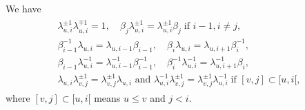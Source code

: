 \documentclass[a4paper,11pt]{amsart}
\numberwithin{equation}{section}
\begin{document}
\begin{lemma}\label{lemma:jm-elements}
We have
\begin{gather}\label{eq:jm-relations}
\begin{gathered}
\lambda_{u,i}^{\pm 1}\lambda_{u,i}^{\mp 1}=1
,\quad
\beta_{j}\lambda_{u,i}^{\pm 1}
=
\lambda_{u,i}^{\pm 1}\beta_{j}
\;\text{if }i-1,i\neq j,
\\
\beta_{i-1}^{-1}\lambda_{u,i}
=
\lambda_{u,i-1}\beta_{i-1}
,\quad
\beta_{i}\lambda_{u,i}
=
\lambda_{u,i+1}\beta_{i}^{-1}
,\\
\beta_{i-1}\lambda_{u,i}^{-1}
=
\lambda_{u,i-1}^{-1}\beta_{i-1}^{-1}
,\quad
\beta_{i}^{-1}\lambda_{u,i}^{-1}
=
\lambda_{u,i+1}^{-1}\beta_{i}
,
\\
\lambda_{u,i}\lambda_{v,j}^{\pm 1}
=\lambda_{v,j}^{\pm 1}\lambda_{u,i}
\text{ and }
\lambda_{u,i}^{-1}\lambda_{v,j}^{\pm 1}
=\lambda_{v,j}^{\pm 1}\lambda_{u,i}^{-1}
\;\text{if }[v,j]\subset[u,i[,
\end{gathered}
\end{gather}
where $[v,j]\subset[u,i[$ means $u\leq v$ and $j<i$. 
\end{lemma}
\end{document}
